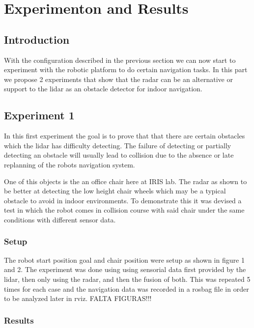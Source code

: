 \chapter{Experimenton and Results}

\section{Introduction}
With the configuration described in the previous section we can now start to experiment with the robotic platform to do certain navigation tasks. In this part we propose 2 experiments that show that the radar can be an alternative or support to the lidar as an obstacle detector for indoor navigation.

\section {Experiment 1}
In this first experiment the goal is to prove that that there are certain obstacles which the lidar has difficulty detecting. The failure of detecting or partially detecting an obstacle will usually lead to collision due to the absence or late replanning of the robots navigation system.

One of this objects is the an office chair here at IRIS lab. The radar as shown to  be better at detecting the low height chair wheels which may be a typical obstacle to avoid in indoor environments. To demonstrate this it was devised a test in which the robot comes in collision course with said chair under the same conditions with different sensor data. 
\subsection{Setup}
The robot start position goal and chair position were setup as shown in figure 1 and 2. The experiment was done using using sensorial data first provided by the lidar, then only using the radar, and then the fusion of both. This was repeated 5 times for each case and the navigation data was recorded in a rosbag file in order to be analyzed later in rviz.
FALTA FIGURAS!!!
\subsection{Results}
